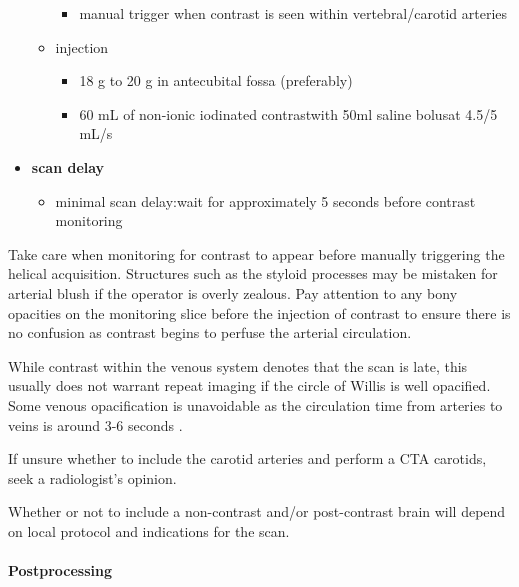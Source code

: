 \begin{itemize}
\begin{itemize}
		\begin{itemize}
			\item
			manual trigger when contrast is seen within vertebral/carotid arteries
		\end{itemize}
		\item
		injection
		
		\begin{itemize}
			\item
			18 g to 20 g in antecubital fossa (preferably)
			\item
			60 mL of non-ionic iodinated contrastwith 50ml saline bolusat 4.5/5 mL/s
		\end{itemize}
	\end{itemize}
	\item
	\textbf{scan delay}
	
	\begin{itemize}
		\item
		minimal scan delay:wait for approximately 5 seconds before contrast monitoring
	\end{itemize}
\end{itemize}

\begin{tcolorbox}[colback=purple!5!white,colframe=purple!75!white,title=Practical points]
	Take care when monitoring for contrast to appear before manually triggering the helical acquisition. Structures such as the styloid processes may be mistaken for arterial blush if the operator is overly zealous. Pay attention to any bony opacities on the monitoring slice before the injection of contrast to ensure there is no confusion as contrast begins to perfuse the arterial circulation.
	
	While contrast within the venous system denotes that the scan is late, this usually does not warrant repeat imaging if the circle of Willis is well opacified. Some venous opacification is unavoidable as the circulation time from arteries to veins is around 3-6 seconds .
	
	If unsure whether to include the carotid arteries and perform a CTA carotids, seek a radiologist's opinion.
	
	Whether or not to include a non-contrast and/or post-contrast brain will depend on local protocol and indications for the scan.
\end{tcolorbox}

\paragraph{Postprocessing}

